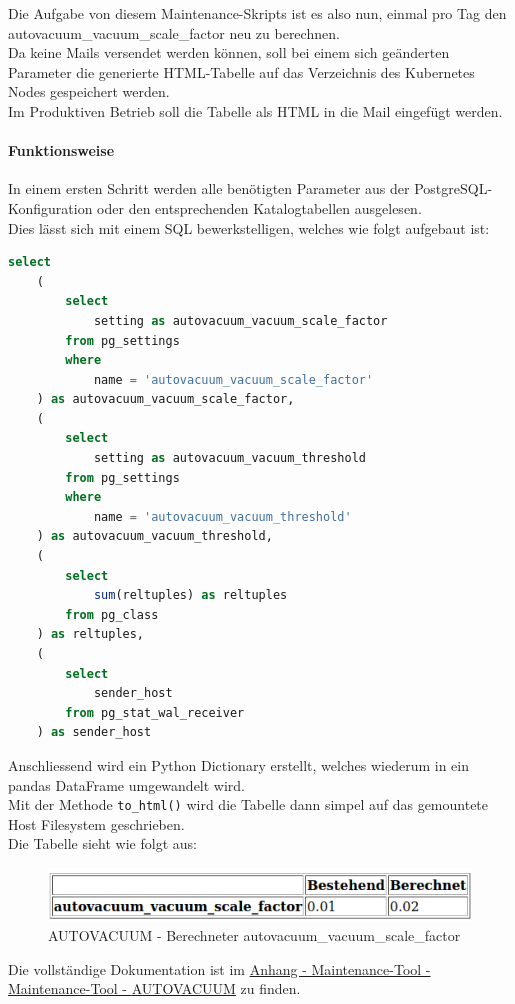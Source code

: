 \begin{flushleft}
    Die Aufgabe von diesem Maintenance-Skripts ist es also nun, einmal pro Tag den autovacuum\_vacuum\_scale\_factor neu zu berechnen.\\
    Da keine Mails versendet werden können, soll bei einem sich geänderten Parameter die generierte HTML-Tabelle auf das Verzeichnis des \Gls{Kubernetes} Nodes gespeichert werden.\\
    Im Produktiven Betrieb soll die Tabelle als HTML in die Mail eingefügt werden.
    \paragraph{Funktionsweise}
    In einem ersten Schritt werden alle benötigten Parameter aus der \Gls{PostgreSQL}-Konfiguration oder den entsprechenden Katalogtabellen ausgelesen.\\
    Dies lässt sich mit einem SQL bewerkstelligen, welches wie folgt aufgebaut ist:
    \lstset{style=gra_codestyle}
    \begin{lstlisting}[language=sql, caption=Maintenance-Tool - Parameter - Maintenance-Tool - AUTOVACUUM,captionpos=b,label={lst:maintenannce-tool-parameter-maintenance-tool-autovacuum},breaklines=true]
select
    (
        select
            setting as autovacuum_vacuum_scale_factor
        from pg_settings
        where
            name = 'autovacuum_vacuum_scale_factor'
    ) as autovacuum_vacuum_scale_factor,
    (
        select
            setting as autovacuum_vacuum_threshold
        from pg_settings
        where
            name = 'autovacuum_vacuum_threshold'
    ) as autovacuum_vacuum_threshold,
    (
        select
            sum(reltuples) as reltuples
        from pg_class
    ) as reltuples,
    (
        select
            sender_host
        from pg_stat_wal_receiver
    ) as sender_host
    \end{lstlisting}
\end{flushleft}
\begin{flushleft}
    Anschliessend wird ein Python Dictionary erstellt, welches wiederum in ein pandas DataFrame umgewandelt wird.\\
    Mit der Methode \texttt{to\_html()} wird die Tabelle dann simpel auf das gemountete Host Filesystem geschrieben.\\
    Die Tabelle sieht wie folgt aus:
    \begin{figure}[H]
        \centering
        \includegraphics[width=1\linewidth]{source/implementation/construction_implementation/maintenance_tool_autovacuum/autovacuum_result_html_table}
        \caption{\Gls{AUTOVACUUM} - Berechneter autovacuum\_vacuum\_scale\_factor}
        \label{fig:autovacuum_result_html_table}
    \end{figure}
\end{flushleft}
\begin{flushleft}
    Die vollständige Dokumentation ist im \hyperref[subsec:maintenance_autovacuum]{Anhang - Maintenance-Tool - Maintenance-Tool - \Gls{AUTOVACUUM}} zu finden.
\end{flushleft}
